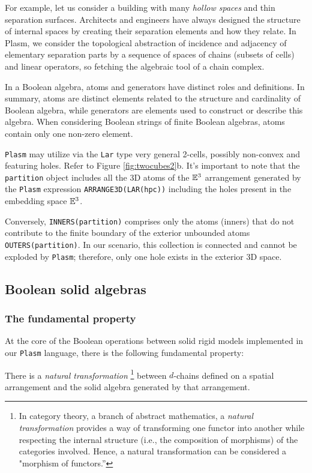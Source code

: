 \documentclass{juliacon}
\begin{document}
For example, let us consider a building with many \emph{hollow spaces} and thin separation surfaces. Architects and engineers have always designed the structure of internal spaces by creating their separation elements and how they relate. In Plasm, we consider the topological abstraction of incidence and adjacency of elementary separation parts by a sequence of spaces of chains (subsets of cells) and linear operators, so fetching the algebraic tool of a chain complex.

In a Boolean algebra, atoms and generators have distinct roles and definitions. 
In summary, atoms are distinct elements related to the structure and cardinality of Boolean algebra, while generators are elements used to construct or describe this algebra. When considering Boolean strings of finite Boolean algebras, atoms contain only one non-zero element.


	{\tt Plasm} may utilize via the {\tt Lar} type very general 2-cells, possibly non-convex and featuring holes. Refer to Figure \ref{fig:twocubes2}b. It’s important to note that the {\tt partition} object includes all the 3D atoms of the $\mathbb{E}^3$ arrangement generated by the {\tt Plasm} expression {\tt ARRANGE3D(LAR(hpc))} including the holes present in the embedding space $\mathbb{E}^3$. 
	
Conversely, {\tt INNERS(partition)} comprises only the atoms (inners) that do not contribute to the finite boundary of the exterior unbounded atoms {\tt OUTERS(partition)}. In our scenario, this collection is connected and cannot be exploded by {\tt Plasm}; therefore, only one hole exists in the exterior 3D space. 

\subsection{Boolean solid algebras}
\label{subsec:title_auth}

\subsubsection*{The fundamental property}\label{sec:traversal}

At the core of the Boolean operations between solid rigid models implemented in our {\tt Plasm} language, there is the following fundamental property:

\begin{property}
    There is a \emph{natural transformation} \footnote{In category theory, a branch of abstract mathematics, a \emph{natural transformation} provides a way of transforming one functor into another while respecting the internal structure (i.e., the composition of morphisms) of the categories involved. Hence, a natural transformation can be considered a "morphism of functors.”} between $d$-chains defined on a spatial arrangement and the solid algebra generated by that arrangement. 
\end{property}
\end{document}
